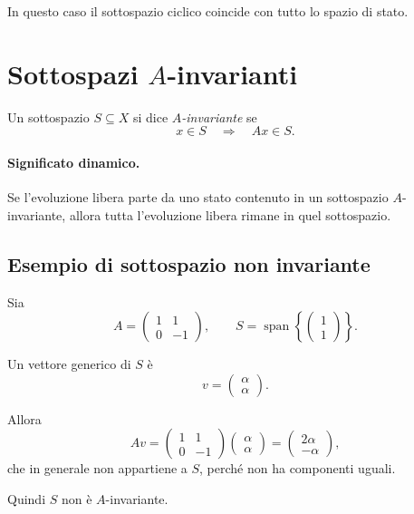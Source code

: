 In questo caso il sottospazio ciclico coincide con tutto lo spazio di stato.

\section{Sottospazi \texorpdfstring{$A$}{A}-invarianti}

Un sottospazio $S\subseteq X$ si dice \emph{$A$-invariante} se
\begin{equation}
x\in S \quad \Longrightarrow \quad Ax\in S.
\label{eq:L5_A_invariant_def}
\end{equation}

\paragraph{Significato dinamico.}
Se l'evoluzione libera parte da uno stato contenuto in un sottospazio $A$-invariante, allora tutta l'evoluzione libera rimane in quel sottospazio.

\subsection{Esempio di sottospazio non invariante}

Sia
\[
A=
\begin{pmatrix}
1 & 1\\
0 & -1
\end{pmatrix},
\qquad
S=\operatorname{span}\left\{
\begin{pmatrix}
1\\
1
\end{pmatrix}
\right\}.
\]

Un vettore generico di $S$ è
\[
v=
\begin{pmatrix}
\alpha\\
\alpha
\end{pmatrix}.
\]

Allora
\[
Av=
\begin{pmatrix}
1 & 1\\
0 & -1
\end{pmatrix}
\begin{pmatrix}
\alpha\\
\alpha
\end{pmatrix}
=
\begin{pmatrix}
2\alpha\\
-\alpha
\end{pmatrix},
\]
che in generale non appartiene a $S$, perché non ha componenti uguali.

Quindi $S$ non è $A$-invariante.

